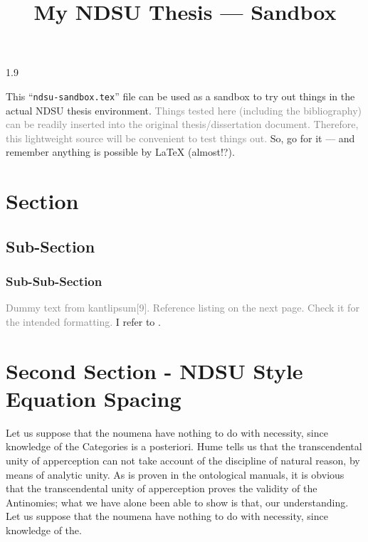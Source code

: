 \documentclass[12pt,chapterrefs]{ndsu-thesis-2022}
\title{My NDSU Thesis --- Sandbox}
\newcommand\myspacing{1.9} %
\begin{document}
\begin{spacing}{\myspacing}      %


This ``\texttt{ndsu-sandbox.tex}'' file can be used as a sandbox to try out things in the actual NDSU thesis environment. \textcolor{gray}{Things tested here (including the bibliography) can be readily inserted into the original thesis/dissertation document. Therefore, this lightweight source will be convenient to test things out.} So, go for it --- and remember anything is possible by \LaTeX{} (almost!?).

\section{Section}
\subsection{Sub-Section}
\subsubsection{Sub-Sub-Section}

\textcolor{gray}{Dummy text from kantlipsum[9]. Reference listing on the next page. Check it for the intended formatting.} I refer to \citep{lamport94,kopka2004guide,baczkowski1990ndsu,cassuto2010advising,pires2021teens}. \kant[9]



\section{Second Section - NDSU Style Equation Spacing}

Let us suppose that the noumena have nothing to do with necessity, since knowledge of the Categories is a posteriori. Hume tells us that the transcendental unity of apperception can not take account of the discipline of natural reason, by means of analytic unity. As is proven in the ontological manuals, it is obvious that the transcendental unity of apperception proves the validity of the Antinomies; what we have alone been able to show is that, our understanding. Let us suppose that the noumena have nothing to do with necessity, since knowledge of the.


\end{spacing}
\end{document}

